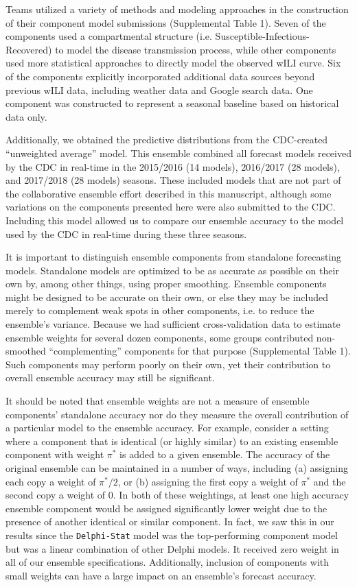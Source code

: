 \documentclass{article}\usepackage[]{graphicx}\usepackage[]{color}
\begin{document}
Teams utilized a variety of methods and modeling approaches in the construction of their component model submissions (Supplemental Table 1). Seven of the components used a compartmental structure (i.e. Susceptible-Infectious-Recovered) to model the disease transmission process, while other components used more statistical approaches to directly model the observed wILI curve. Six of the components explicitly incorporated additional data sources beyond previous wILI data, including weather data and Google search data. One component was constructed to represent a seasonal baseline based on historical data only.

Additionally, we obtained the predictive distributions from the CDC-created ``unweighted average'' model. This ensemble combined all forecast models received by the CDC in real-time in the 2015/2016 (14 models), 2016/2017 (28 models), and 2017/2018 (28 models) seasons.\cite{McGowan2018} These included models that are not part of the collaborative ensemble effort described in this manuscript, although some variations on the components presented here were also submitted to the CDC. Including this model allowed us to compare our ensemble accuracy to the model used by the CDC in real-time during these three seasons.

It is important to distinguish ensemble components from standalone forecasting models.  
Standalone models are optimized to be as accurate as possible on their own by, among other things, using proper smoothing.
Ensemble components might be designed to be accurate on their own, or else they may be included merely to complement weak spots in other components, i.e. to reduce the ensemble's variance.  
Because we had sufficient cross-validation data to estimate ensemble weights for several dozen components, some groups contributed non-smoothed ``complementing'' components for that purpose (Supplemental Table 1).  
Such components may perform poorly on their own, yet their contribution to overall ensemble accuracy may still be significant.

It should be noted that ensemble weights are not a measure of ensemble components' standalone accuracy nor do they measure the overall contribution of a particular model to the ensemble accuracy.
For example, consider a setting where a component that is identical (or highly similar) to an existing ensemble component with weight $\pi^*$ is added to a given ensemble. 
The accuracy of the original ensemble can be maintained in a number of ways, including (a) assigning each copy a weight of $\pi^*/2$, or (b) assigning the first copy a weight of $\pi^*$ and the second copy a weight of $0$. 
In both of these weightings, at least one high accuracy ensemble component would be assigned significantly lower weight due to the presence of another identical or similar component.
In fact, we saw this in our results since the {\tt Delphi-Stat} model was the top-performing component model but was a linear combination of other Delphi models.
It received zero weight in all of our ensemble specifications.
Additionally, inclusion of components with small weights can have a large impact on an ensemble's forecast accuracy.
\end{document}
